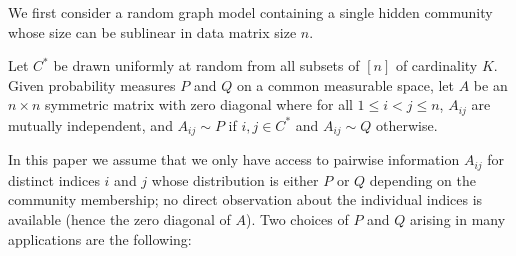 We first consider a random graph model containing a single hidden community whose size can be sublinear in data matrix size $n$. 

 
\begin{definition}  \label{def:single}
 Let $C^*$ be drawn uniformly at random from all subsets of $[n]$ of cardinality $K$.
 Given probability measures $P$ and $Q$ on a common measurable space, 
 let $A$ be an $n \times n$ symmetric matrix with zero diagonal
 where for all $1 \le i<j \le n$, $A_{ij}$ are mutually independent, and $A_{ij} \sim P$ if $i,j\in C^*$ and $A_{ij} \sim Q$ otherwise.
\end{definition}

In this paper we assume that we only have access to pairwise information $A_{ij}$ for distinct indices $i$ and $j$ whose distribution is either $P$ or $Q$ depending on the community membership;
no direct observation about the individual indices is available (hence the zero diagonal of $A$).
Two choices of $P$ and $Q$ arising in many applications are the following:
